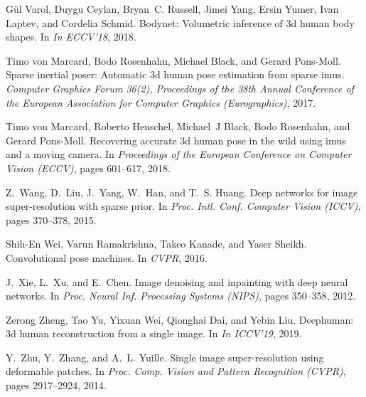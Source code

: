 \documentclass{bmvc2k}
\begin{document}
\begin{thebibliography}{47}
G{\"{u}}l Varol, Duygu Ceylan, Bryan~C. Russell, Jimei Yang, Ersin Yumer, Ivan
  Laptev, and Cordelia Schmid.
\newblock Bodynet: Volumetric inference of 3d human body shapes.
\newblock In \emph{In ECCV'18}, 2018{}.

Timo von Marcard, Bodo Rosenhahn, Michael Black, and Gerard Pons-Moll.
\newblock Sparse inertial poser: Automatic 3d human pose estimation from sparse
  imus.
\newblock \emph{Computer Graphics Forum 36(2), Proceedings of the 38th Annual
  Conference of the European Association for Computer Graphics (Eurographics)},
  2017.

Timo von Marcard, Roberto Henschel, Michael~J Black, Bodo Rosenhahn, and Gerard
  Pons-Moll.
\newblock Recovering accurate 3d human pose in the wild using imus and a moving
  camera.
\newblock In \emph{Proceedings of the European Conference on Computer Vision
  (ECCV)}, pages 601--617, 2018.

Z.~Wang, D.~Liu, J.~Yang, W.~Han, and T.~S. Huang.
\newblock Deep networks for image super-resolution with sparse prior.
\newblock In \emph{Proc. Intl. Conf. Computer Vision (ICCV)}, pages 370--378,
  2015.

Shih-En Wei, Varun Ramakrishna, Takeo Kanade, and Yaser Sheikh.
\newblock Convolutional pose machines.
\newblock In \emph{CVPR}, 2016.

J.~Xie, L.~Xu, and E.~Chen.
\newblock Image denoising and inpainting with deep neural networks.
\newblock In \emph{Proc. Neural Inf. Processing Systems (NIPS)}, pages
  350--358, 2012.

Zerong Zheng, Tao Yu, Yixuan Wei, Qionghai Dai, and Yebin Liu.
\newblock Deephuman: 3d human reconstruction from a single image.
\newblock In \emph{In ICCV'19}, 2019.

Y.~Zhu, Y.~Zhang, and A.~L. Yuille.
\newblock Single image super-resolution using deformable patches.
\newblock In \emph{Proc. Comp. Vision and Pattern Recognition (CVPR)}, pages
  2917--2924, 2014.

\end{thebibliography}
 
\end{document}
